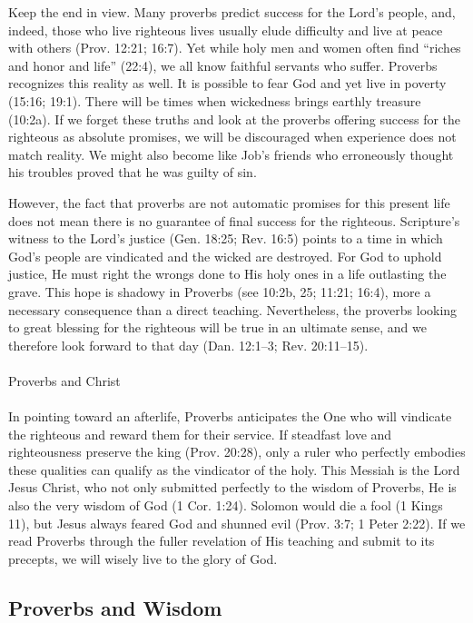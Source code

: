 Keep the end in view. Many proverbs predict success for the Lord’s people, and, indeed, those who live righteous lives usually elude difficulty and live at peace with others (Prov. 12:21; 16:7). Yet while holy men and women often find “riches and honor and life” (22:4), we all know faithful servants who suffer. Proverbs recognizes this reality as well. It is possible to fear God and yet live in poverty (15:16; 19:1). There will be times when wickedness brings earthly treasure (10:2a). If we forget these truths and look at the proverbs offering success for the righteous as absolute promises, we will be discouraged when experience does not match reality. We might also become like Job’s friends who erroneously thought his troubles proved that he was guilty of sin.

However, the fact that proverbs are not automatic promises for this present life does not mean there is no guarantee of final success for the righteous. Scripture’s witness to the Lord’s justice (Gen. 18:25; Rev. 16:5) points to a time in which God’s people are vindicated and the wicked are destroyed. For God to uphold justice, He must right the wrongs done to His holy ones in a life outlasting the grave. This hope is shadowy in Proverbs (see 10:2b, 25; 11:21; 16:4), more a necessary consequence than a direct teaching. Nevertheless, the proverbs looking to great blessing for the righteous will be true in an ultimate sense, and we therefore look forward to that day (Dan. 12:1–3; Rev. 20:11–15).\\
\\
 Proverbs and Christ\\
 \\
In pointing toward an afterlife, Proverbs anticipates the One who will vindicate the righteous and reward them for their service. If steadfast love and righteousness preserve the king (Prov. 20:28), only a ruler who perfectly embodies these qualities can qualify as the vindicator of the holy. This Messiah is the Lord Jesus Christ, who not only submitted perfectly to the wisdom of Proverbs, He is also the very wisdom of God (1 Cor. 1:24). Solomon would die a fool (1 Kings 11), but Jesus always feared God and shunned evil (Prov. 3:7; 1 Peter 2:22). If we read Proverbs through the fuller revelation of His teaching and submit to its precepts, we will wisely live to the glory of God.  

\newpage
\subsection{Proverbs and Wisdom}

